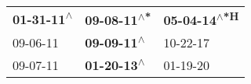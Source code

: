\begin{supertabular}{lll}
 \textbf{01-31-11\textsuperscript{$\wedge$}} &  \textbf{09-08-11\textsuperscript{$\wedge$*}} &  \textbf{05-04-14\textsuperscript{$\wedge$*H}} \\
                  09-06-11\textsuperscript{} &   \textbf{09-09-11\textsuperscript{$\wedge$}} &                     10-22-17\textsuperscript{} \\
                  09-07-11\textsuperscript{} &   \textbf{01-20-13\textsuperscript{$\wedge$}} &                     01-19-20\textsuperscript{} \\
\end{supertabular}
